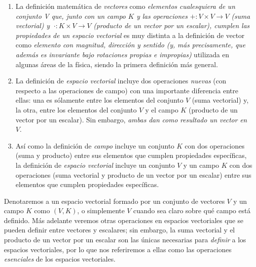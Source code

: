 \documentclass[apuntes]{subfiles}
\begin{document}
\begin{Obs}\label{obs:1.5}\leavevmode
 \begin{enumerate}[label=(\arabic*)]

    \item La definición matemática de \emph{vectores} como \emph{elementos cualesquiera de un conjunto V que, junto con un campo $K$ y las operaciones $+:V\times V\to V$ (suma vectorial) y $\ \cdot:K\times V\to V$ (producto de un vector por un escalar), cumplen las propiedades de un espacio vectorial} es muy distinta a la definición de vector como \emph{elemento con magnitud, dirección y sentido (y, más precisamente, que además es invariante bajo rotaciones propias e impropias)} utilizada en algunas áreas de la física, siendo la primera definición más general.

    \item La definición de \emph{espacio vectorial} incluye dos operaciones \emph{nuevas} (con respecto a las operaciones de campo) con una importante diferencia entre ellas: una es sólamente entre los elementos del conjunto $V$ (suma vectorial) y, la otra, entre los elementos del conjunto $V$ y el campo $K$ (producto de un vector por un escalar). Sin embargo, \emph{ambas dan como resultado un vector en $V$}.

    \item Así como la definición de \emph{campo} incluye un conjunto $K$ con dos operaciones (suma y producto) entre sus elementos que cumplen propiedades específicas, la definición de \emph{espacio vectorial} incluye un conjunto $V$ y un campo $K$ con dos operaciones (suma vectorial y producto de un vector por un escalar) entre sus elementos que cumplen propiedades específicas.
\end{enumerate}
\end{Obs}

\noindent Denotaremos a un espacio vectorial formado por un conjunto de vectores $V$ y un campo $K$ como $(V,K)$, o simplemente $V$ cuando sea claro sobre qué campo está definido. Más adelante veremos otras operaciones en espacios vectoriales que se pueden definir entre vectores y escalares; sin embargo, la suma vectorial y el producto de un vector por un escalar son las únicas necesarias para \emph{definir} a los espacios vectoriales, por lo que nos referiremos a ellas como las operaciones \emph{esenciales} de los espacios vectoriales.
\end{document}
